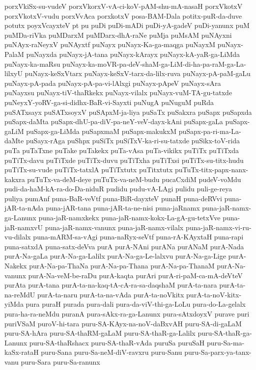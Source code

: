 {porxVkiSx-su-vudeV
porxVkorxV-vA-ci-koV-pAM-shu-mA-nasaH
porxVkotxV
porxVkotxV-vudu
porxVvAca
porxkotxV
posa-BAM-Dala
potitx-puR-da-duve
potutx
poyxVcayxteV
pt
pu
puDi
puDi-mADi
puDi-yA-gadeV
puDi-yanunx
puM
puMDa-riVka
puMDarxM
puMDarx-dhA-raNe
puMja
puMsAM
puNAyxni
puNAyx-raNeyxV
puNAyxtf
puNayx
puNayx-Ka-ga-maqga
puNayxM
puNayx-PalaM
puNayxda
puNayx-jA-tana
puNayx-kArayx
puNayx-kA-yaR-ga-LiMda
puNayx-ka-maRsu
puNayx-ka-moVR-pa-deV-shaM-ga-LiM-di-ha-pa-raM-ga-La-lilxyU
puNayx-keSxVtarx
puNayx-keSxV-tarx-da-lilx-ruva
puNayx-pA-paM-gaLu
puNayx-pA-pada
puNayx-pA-pa-vi-lAlxgi
puNayx-pApeV
puNayx-sAra
puNayxsu
puNayx-tiV-thaRkekx
puNayx-vilalx
puNayx-vuM-TA-gu-tatxde
puNeyxY-yoRV-ga-si-didhx-BaR-vi-Sayxti
puNugA
puNuguM
puRda
puSATxsayx
puSATxsoyxV
puSApxM-ja-liya
puSaTx
puSakxra
puSapx
puSapxda
puSapx-daMta
puSapx-dhU-pa-diV-pa-neY-veV-dayx-kAni
puSapx-gaLa
puSapx-gaLiM
puSapx-ga-LiMda
puSapxmaM
puSapx-makukxM
puSapx-pa-ri-ma-La-daMte
puSayx-rAga
puShpx
puSiTx
puSiTxV-ka-ri-su-tatxde
puSikx-toV-rida
puTa
puTaTxne
puTake
puTakekx
puTa-vAsa
puTa-vikikx
puTiTx
puTiTxda
puTiTx-davu
puTiTxde
puTiTx-duvu
puTiTxha
puTiTxsi
puTiTx-su-titx-hudu
puTiTx-su-vude
puTiTx-tatxlA
puTiTxtutx
puTitxtutx
puTuTx-titx-papx-nanx-kakxra
puTuTx-va-deM-deye
puTuTx-va-neM-budu
pucaCxdiM
pudeV-voMdu
pudi-da-haM-kA-ra-do-Da-niduR
pudidu
pudu-vA-LAgi
pulidu
puli-ge-reya
puliya
pumAnf
puna-BaR-veVtf
puna-BiR-dayxteV
punaH
puna-deRVvi
puna-jAR-ta-nAda
puna-jAR-tana
puna-jAR-ta-ne-nisi
puna-jaRnamx
puna-jaR-namx-ga-Lanunx
puna-jaR-namxkekx
puna-jaR-namx-kokx-La-gA-gu-tetxVve
puna-jaR-namxvU
puna-jaR-namx-vanunx
puna-jaR-namx-vilalx
puna-jaR-namx-vi-ru-vu-dilalx
puna-mARM-sa-vAgi
puna-naRyx-seVtf
puna-rA-KAyxtaH
puna-rapi
puna-satxdA
puna-satx-deVva
purA
purA-NAni
purANa
purANaM
purA-Nada
purA-Na-gaLa
purA-Na-ga-Lalilx
purA-Na-ga-Le-lalxvu
purA-Na-ga-Lige
purA-Nakekx
purA-Na-pa-ThaNa
purA-Na-pa-Thana
purA-Na-pa-ThanaM
purA-Na-vanunx
purA-Na-veM-be-raDu
purA-kaqta
purAri
purA-ri-paM-ca-mA-deVteV
purAta
purA-tana
purA-ta-na-kaq-tA-cA-ra-sa-daqshaM
purA-ta-nara
purA-ta-na-reMdU
purA-ta-naru
purA-ta-na-vAda
purA-ta-noVkitx
purA-ta-noV-kitx-yiMda
pura
puraH
purada
pura-dali
pura-da-viV-thi-ga-LoLu
pura-do-La-gelalx
pura-ha-ra-neMdu
puranA
pura-sAkx-ra-ga-Lanunx
pura-sAtxdoyxV
purave
puri
puriVSaM
puroV-hi-tara
puru-SA-KAyx-na-noV-daBxvAH
puru-SA-di-gaLaM
puru-SA-hAra
puru-SA-thaRM-gaLaM
puru-SA-thaR-ga-Lalilx
puru-SA-thaR-ga-Lanunx
puru-SA-thaRshacx
puru-SA-thaR-vAda
puruSa
puruSaH
puru-Sa-ma-kaSx-rataH
puru-Sana
puru-Sa-neM-diV-ravxru
puru-Sanu
puru-Sa-parx-ya-tanx-vanu
puru-Sara
puru-Sa-ranunx
}
